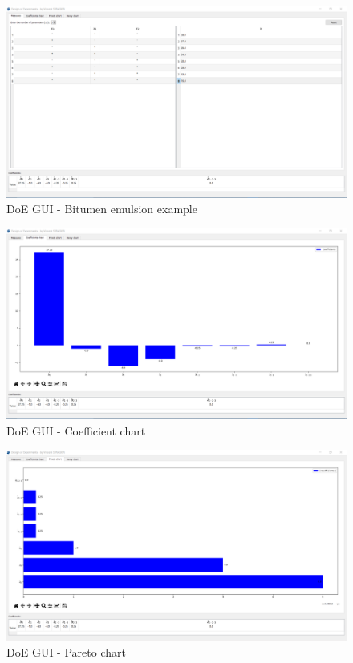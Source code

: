 \documentclass[english, 12 pt, openany, oneside]{book}
\begin{document}
\begin{figure}[!ht]
\centering
\includegraphics[width=\linewidth]{doe_gui_filled}
\caption{DoE GUI - Bitumen emulsion example\cite{goupy_methods_1993}\label{fig:doe_gui_filled}}
\end{figure}

\begin{figure}[!ht]
\centering
\includegraphics[width=\linewidth]{doe_gui_coef}
\caption{DoE GUI - Coefficient chart\label{fig:doe_gui_coef}}
\end{figure}

\begin{figure}[!ht]
\centering
\includegraphics[width=\linewidth]{doe_gui_pareto}
\caption{DoE GUI - Pareto chart\label{fig:doe_gui_pareto}}
\end{figure}
\end{document}
